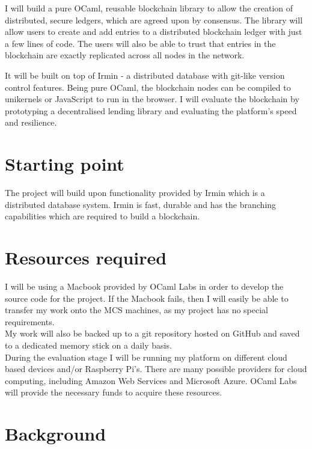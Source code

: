\documentclass[12pt, letterpaper, twoside]{article}
\begin{document}
	\noindent I will build a pure OCaml, reusable blockchain library to allow the creation of distributed, secure ledgers, which are agreed upon by consensus. The library will allow users to create and add entries to a distributed blockchain ledger with just a few lines of code. The users will also be able to trust that entries in the blockchain are exactly replicated across all nodes in the network.

	\noindent It will be built on top of Irmin \cite{Irmin} - a distributed database with git-like version control features. Being pure OCaml, the blockchain nodes can be compiled to unikernels or JavaScript to run in the browser. I will evaluate the blockchain by prototyping a decentralised lending library and evaluating the platform’s speed and resilience.
	\section*{Starting point}
	The project will build upon functionality provided by Irmin \cite{Irmin} which is a distributed database system. 
	Irmin is fast, durable and has the branching capabilities which are required to build a blockchain.

	\section*{Resources required}
	I will be using a Macbook provided by OCaml Labs \cite{OCaml Labs} in order to develop the source code for the project. If the Macbook fails, then I will easily be able to transfer my work onto the MCS machines, as my project has no special requirements. \\
	My work will also be backed up to a git repository hosted on GitHub and saved to a dedicated memory stick on a daily basis. \\
	During the evaluation stage I will be running my platform on different cloud based devices and/or Raspberry Pi's. There are many possible providers for cloud computing, including Amazon Web Services and Microsoft Azure. OCaml Labs \cite{OCaml Labs} will provide the necessary funds to acquire these resources.
	

	
	\section*{Background}
\end{document}
